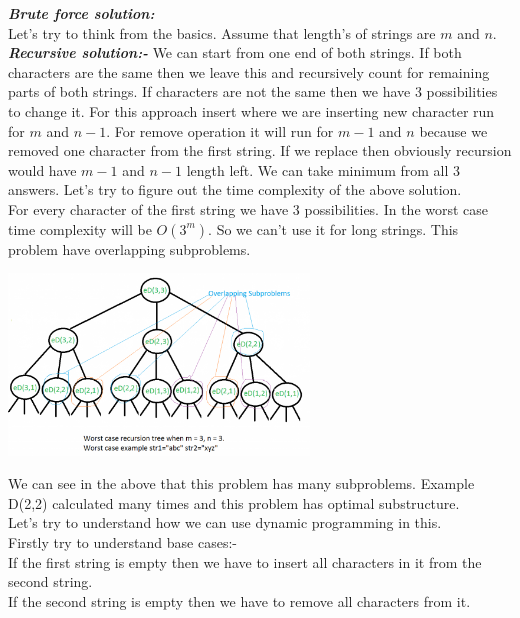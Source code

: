 \documentclass[12pt]{book}
\begin{document}
\textbf{\textit{Brute force solution:}}\\

Let's try to think from the basics.\newline
Assume that length's of strings are $m$ and $n$.\\

\textbf{\textit{Recursive solution:-}}\newline
We can start from one end of both strings. If both characters are the same then we leave this and recursively count for remaining parts of both strings. If characters are not the same then we have 3 possibilities to change it.\newline
For this approach insert where we are inserting new character run for $m$ and $n-1$.
For remove operation it will run for $m-1$ and $n$ because we removed one character from the first string. If we replace then obviously recursion would have $m-1$ and $n-1$ length left.\newline
We can take minimum from all 3 answers. Let’s try to figure out the time complexity of the above solution.\\

For every character of the first string we have 3 possibilities. In the worst case time complexity will be $O(3^m)$. So we can’t use it for long strings.\newline
This problem have overlapping subproblems.\\
\begin{center}
    \includegraphics[width = 8cm]{Edit_Distance-1.png}    
\end{center}

We can see in the  above that this problem has many subproblems. Example D(2,2) calculated many times and this problem has optimal substructure.\\

Let’s try to understand how we can use dynamic programming in this.\\
Firstly try to understand base cases:-\\
If the first string is empty then we have to insert all characters in it from the second string.\\
If the second string is empty then we have to remove all characters from it.\\
\end{document}
